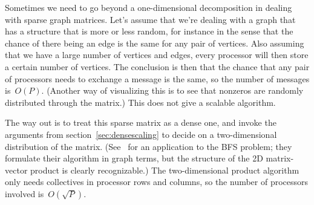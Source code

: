 Sometimes we need to go beyond a one-dimensional decomposition in dealing
with sparse graph matrices.
Let's assume that we're dealing with a graph that has a structure that
is more or less random, for instance in the sense that the chance of
there being an edge is the same for any pair of vertices. Also
assuming that we have a large number of vertices and edges, every
processor will then store a certain number of vertices. The conclusion
is then that the chance that any pair of processors needs to exchange
a message is the same, so the number of messages is~$O(P)$. (Another
way of visualizing this is to see that nonzeros are randomly
distributed through the matrix.) This does not give a scalable
algorithm.

The way out is to treat this sparse matrix as a dense one, and invoke
the arguments from section~\ref{sec:densescaling} to decide on a
two-dimensional distribution of the matrix.
(See~\cite{Yoo:2005:scalable-bfs} for an application to the \ac{BFS}
problem; they formulate their algorithm in graph terms, but the
structure of the 2D matrix-vector product is clearly recognizable.)
The two-dimensional product algorithm only needs collectives in
processor rows and columns, so the number of processors involved
is~$O(\sqrt P)$.

\endinput

Triadic closure: if $(i,j)\in E$ and $(i,k)\in E$ then $(j,k)\in E$;
example: friend or trust relationship.

A \indextermsub{scale-free}{network}, or one that observes a
\indexterm{power law}, is one where the fraction of nodes with
degree~$k$ is proportional to $k^{-\gamma}$ where $\gamma$ is
positive, typically $2<\gamma<3$. There are claims that graphs such as
the \ac{WWW} obey power laws; this is a claim about the logical
structure, not the physical one, which is very hard to
infer~\cite{Willinger:internet}.

A small-world network can be created by extending an existing network
by \emph{preferential attachment}:
the chance of attaching a new node is proportional to the degree
of the old node.

Power law networks usually have a very small diameter.

